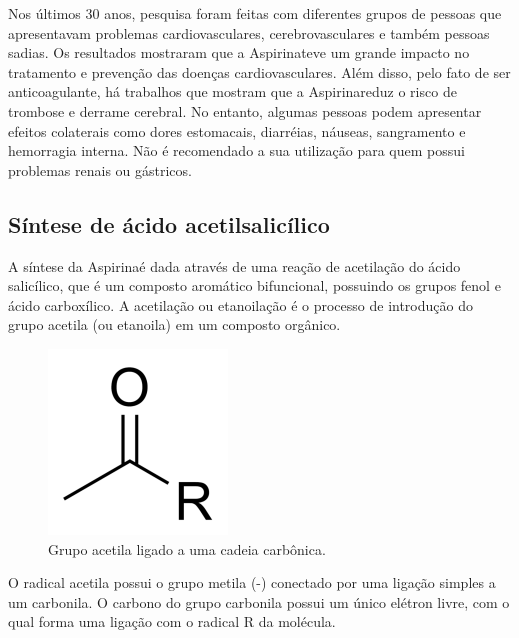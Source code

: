 Nos últimos 30 anos, pesquisa foram feitas com diferentes grupos de pessoas que apresentavam
problemas cardiovasculares, cerebrovasculares e também pessoas sadias. Os resultados mostraram que a
Aspirina\R teve um grande impacto no tratamento e prevenção das doenças cardiovasculares.  Além
disso, pelo fato de ser anticoagulante, há trabalhos que mostram que a Aspirina\R reduz o risco de
trombose e derrame cerebral. No entanto, algumas pessoas podem apresentar efeitos colaterais como
dores estomacais, diarréias, náuseas, sangramento e hemorragia interna. Não é recomendado a sua
utilização para quem possui problemas renais ou gástricos.

\subsection{Síntese de ácido acetilsalicílico}

A síntese da Aspirina\R é dada através de uma reação de acetilação do ácido salicílico, que é um
composto aromático bifuncional, possuindo os grupos fenol e ácido carboxílico. A acetilação ou
etanoilação é o processo de introdução do grupo acetila (ou etanoila) em um composto orgânico.

\begin{figure}[H]
\begin{center}
    \includegraphics[width=.4\textwidth]{figuras/im1.png}
\end{center}
\caption{Grupo acetila ligado a uma cadeia carbônica.}\label{fig:im1}
\end{figure}

O radical acetila possui o grupo metila (-) conectado por uma ligação simples a um
carbonila. O carbono do grupo carbonila possui um único elétron livre, com o qual forma uma ligação
com o radical R da molécula.

